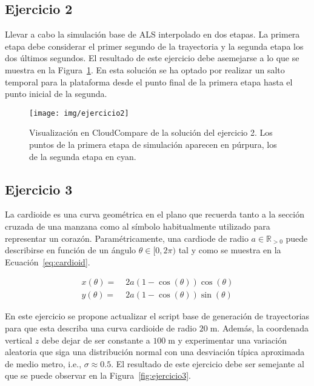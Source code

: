 \documentclass[]{article}
\begin{document}
	\pagebreak
	

	\subsection*{Ejercicio 2}
	Llevar a cabo la simulación base de ALS interpolado en dos etapas. La primera etapa debe considerar el primer segundo de la trayectoria y la segunda etapa los dos últimos segundos. El resultado de este ejercicio debe asemejarse a lo que se muestra en la Figura~\ref{fig:ejercicio2}. En esta solución se ha optado por realizar un salto temporal para la plataforma desde el punto final de la primera etapa hasta el punto inicial de la segunda.
	
	\begin{figure}[htb]
		\centering
		\texttt{[image: img/ejercicio2]}
		\caption{Visualización en CloudCompare de la solución del ejercicio 2. Los puntos de la primera etapa de simulación aparecen en púrpura, los de la segunda etapa en cyan.}
		\label{fig:ejercicio2}
	\end{figure} 

	
	\pagebreak


	\subsection*{Ejercicio 3}
	La cardioide es una curva geométrica en el plano que recuerda tanto a la sección cruzada de una manzana como al símbolo habitualmente utilizado para representar un corazón. Paramétricamente, una cardiode de radio $a \in \mathbb{R}_{>0}$ puede describirse en función de un ángulo $\theta \in [0, 2\pi)$ tal y como se muestra en la Ecuación~\ref{eq:cardioid}.
	
	\begin{equation}
		\begin{split}
			x(\theta) =&\; 2a(1-\cos(\theta))\cos(\theta) \\
			y(\theta) =&\; 2a(1-\cos(\theta))\sin(\theta)
		\end{split}
	\label{eq:cardioid}
	\end{equation}

	En este ejercicio se propone actualizar el script base de generación de trayectorias para que esta describa una curva cardioide de radio $20\;\text{m}$. Además, la coordenada vertical $z$ debe dejar de ser constante a $100\;\text{m}$ y experimentar una variación aleatoria que siga una distribución normal con una desviación típica aproximada de medio metro, i.e., $\sigma \approx 0.5$. El resultado de este ejercicio debe ser semejante al que se puede observar en la Figura~\ref{fig:ejercicio3}.
	
\end{document}
